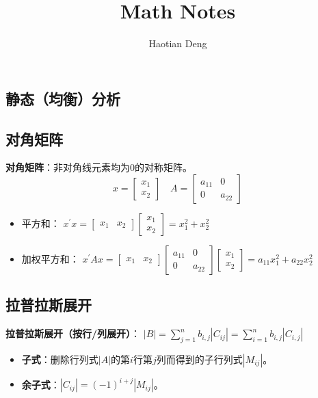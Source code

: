 \documentclass[12pt, a4paper, oneside]{article}
\title{\textbf{Math Notes}}
\author{Haotian Deng}
\date{}
\begin{document}
\maketitle

\begin{CJK*}{UTF8}{gbsn}


\newpage
\section{静态（均衡）分析}
%
\subsection{对角矩阵}
\textbf{对角矩阵}：非对角线元素均为0的对称矩阵。
$$
x=\left[\begin{array}{l}x_{1} \\ x_{2}\end{array}\right]
\quad
A=\left[\begin{array}{cc}a_{11} & 0 \\ 0 & a_{22}\end{array}\right]
$$
\begin{itemize}
	\item 平方和：
		$
		x^{\prime}x=
		\left[\begin{array}{ll}x_{1} & x_{2}\end{array}\right]
		\left[\begin{array}{l}x_{1} \\ x_{2}\end{array}\right]
		=x_{1}^{2}+x_{2}^{2}
		$
	\item 加权平方和：
		$
		x^{\prime}Ax=
		\left[\begin{array}{ll}x_{1} & x_{2}\end{array}\right]
		\left[\begin{array}{cc}a_{11} & 0 \\ 0 & a_{22}\end{array}\right]
		\left[\begin{array}{l}x_{1} \\ x_{2}\end{array}\right]
		=a_{11} x_{1}^{2}+a_{22} x_{2}^{2}
		$
\end{itemize}

%
\subsection{拉普拉斯展开}
\noindent
\textbf{拉普拉斯展开（按行/列展开）}：
$
|B|=\sum_{j=1}^{n}b_{i, j}\left|C_{ij}\right|=\sum_{i=1}^{n}b_{i, j}\left|C_{i,j}\right|
$
\begin{itemize}
	\item \textbf{子式}：删除行列式$|A|$的第$i$行第$j$列而得到的子行列式$|M_{ij}|$。
	\item \textbf{余子式}：$\left|C_{ij}\right|=(-1)^{i+j}\left|M_{ij}\right|$。
\end{itemize}


\end{CJK*}
\end{document}

